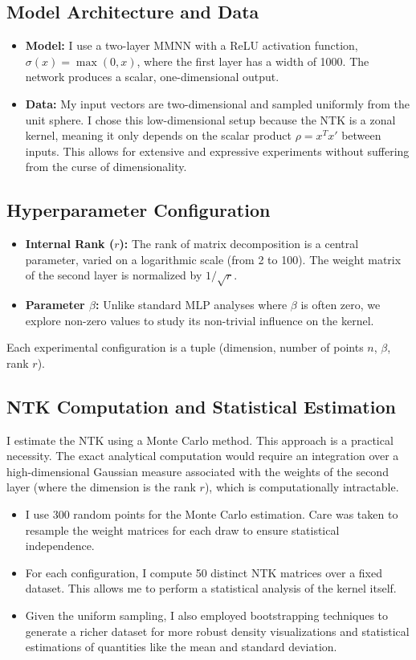 \documentclass[12pt]{article}
\begin{document}
\subsection{Model Architecture and Data}
\begin{itemize}
    \item \textbf{Model:} I use a two-layer MMNN with a ReLU activation function, $\sigma(x) = \max(0, x)$, where the first layer has a width of 1000. The network produces a scalar, one-dimensional output.
    \item \textbf{Data:} My input vectors are two-dimensional and sampled uniformly from the unit sphere. I chose this low-dimensional setup because the NTK is a zonal kernel, meaning it only depends on the scalar product $\rho = x^T x'$ between inputs. This allows for extensive and expressive experiments without suffering from the curse of dimensionality.
\end{itemize}

\subsection{Hyperparameter Configuration}
\begin{itemize}
    \item \textbf{Internal Rank ($r$):} The rank of matrix decomposition is a central parameter, varied on a logarithmic scale (from 2 to 100). The weight matrix of the second layer is normalized by $1/\sqrt{r}$.
    \item \textbf{Parameter $\beta$:} Unlike standard MLP analyses where $\beta$ is often zero, we explore non-zero values to study its non-trivial influence on the kernel.
\end{itemize}
Each experimental configuration is a tuple (dimension, number of points $n$, $\beta$, rank $r$).

\subsection{NTK Computation and Statistical Estimation}
I estimate the NTK using a Monte Carlo method. This approach is a practical necessity. The exact analytical computation would require an integration over a high-dimensional Gaussian measure associated with the weights of the second layer (where the dimension is the rank $r$), which is computationally intractable.
\begin{itemize}
    \item I use 300 random points for the Monte Carlo estimation. Care was taken to resample the weight matrices for each draw to ensure statistical independence.
    \item For each configuration, I compute 50 distinct NTK matrices over a fixed dataset. This allows me to perform a statistical analysis of the kernel itself.
    \item Given the uniform sampling, I also employed bootstrapping techniques to generate a richer dataset for more robust density visualizations and statistical estimations of quantities like the mean and standard deviation.
\end{itemize}
\end{document}
